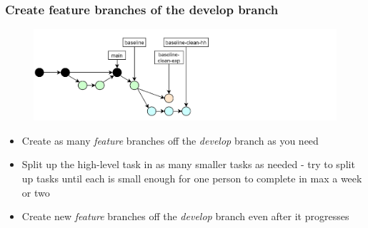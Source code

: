 \documentclass[aspectratio=169]{beamer} %
\begin{document}
\begin{frame}
	\frametitle{Create feature branches of the develop branch}

	\vspace{-.5cm}
	\begin{minipage}[t][5cm][t]{\textwidth}
		\begin{figure}
			\centering
			\includegraphics[width=\textwidth]{./img/dime-gitflow-network-2-2.png}
		\end{figure}
	\end{minipage}

	\vspace{-.5cm}
	\begin{minipage}[t][5cm][t]{\textwidth}
		\begin{itemize}
			\setlength\itemsep{.5em}
			\item Create as many \textit{feature} branches off
			the \textit{develop} branch as you need
			\item Split up the high-level task in as many smaller tasks as needed
			- try to split up tasks until each is small enough
			for one person to complete in max a week or two
			\item Create new \textit{feature} branches off
			the \textit{develop} branch even after it progresses
		\end{itemize}
	\end{minipage}
\end{frame}
\end{document}
